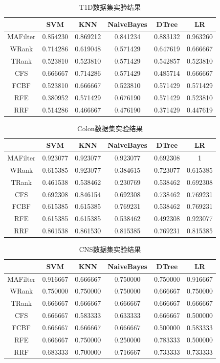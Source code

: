 \documentclass{njubachelor}
\begin{document}
\begin{table}        
\centering
\caption{T1D数据集实验结果}
\begin{tabular}{cccccc}
\hline
  & SVM & KNN & NaiveBayes & DTree & LR\\
\hline
MAFilter&0.854230&	0.869212&	0.841234&	0.883132&	0.963260\\
WRank&	0.714286&	0.619048&	0.571429&	0.647619&	0.666667\\
TRank&	0.523810&	0.523810&	0.571429&	0.542857&	0.523810\\
CFS&	0.666667&	0.714286&	0.571429&	0.485714&	0.666667\\
FCBF&	0.523810&	0.666667&	0.523810&	0.571429&	0.571429\\
RFE&	0.380952&	0.571429&	0.676190&	0.571429&	0.523810\\
RRF&	0.514286&	0.466667&	0.476190&	0.371429&	0.447619\\
\hline
\end{tabular}
\end{table}

\begin{table}        
\centering
\caption{Colon数据集实验结果}
\begin{tabular}{cccccc}
\hline
  & SVM & KNN & NaiveBayes & DTree & LR\\
\hline
MAFilter&0.923077&	0.923077&	0.923077&	0.692308&	1\\
WRank&	0.615385&	0.923077&	0.384615&	0.723077&	0.615385\\
TRank&	0.461538&	0.538462&	0.230769&	0.538462&	0.692308\\
CFS&	0.692308&	0.846154&	0.692308&	0.738462&	0.769231\\
FCBF&	0.615385&	0.615385&	0.769231&	0.538462&	0.769231\\
RFE&	0.615385&	0.615385&	0.538462&	0.492308&	0.923077\\
RRF&	0.861538&	0.861530&	0.815385&	0.769231&	0.815385\\
\hline
\end{tabular}
\end{table}

\begin{table}        
\centering
\caption{CNS数据集实验结果}
\begin{tabular}{cccccc}
\hline
  & SVM & KNN & NaiveBayes & DTree & LR\\
\hline
MAFilter&0.916667&	0.666667&	0.750000&	0.750000&	0.916667\\
WRank&	0.750000&	0.750000&	0.750000&	0.666667&	0.750000\\
TRank&	0.666667&	0.666667&	0.666667&	0.666667&	0.666667\\
CFS&	0.666667&	0.583333&	0.633333&	0.666667&	0.500000\\
FCBF&	0.666667&	0.666667&	0.666667&	0.500000&	0.583333\\
RFE&	0.666667&	0.750000&	0.250000&	0.783333&	0.500000\\
RRF&	0.683333&	0.700000&	0.716667&	0.733333&	0.733333\\  
\hline
\end{tabular}
\end{table}
\end{document}
